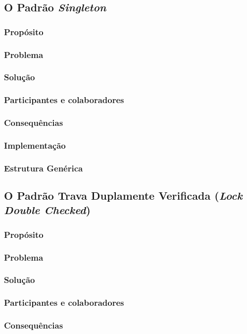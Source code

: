 \documentclass[
	11pt,				%
	openright,
	twoside,			%
	a4paper,			%
	english,			%
	french,
	brazil,				%
	sumario=tradicional
	]{abntex2}
\begin{document}
\subsection{O Padrão \textit{Singleton}}
\subsubsection{Propósito}
\subsubsection{Problema}
\subsubsection{Solução}
\subsubsection{Participantes e colaboradores}
\subsubsection{Consequências}
\subsubsection{Implementação}
\subsubsection{Estrutura Genérica}

\subsection{O Padrão Trava Duplamente Verificada (\textit{Lock Double Checked})}
\subsubsection{Propósito}
\subsubsection{Problema}
\subsubsection{Solução}
\subsubsection{Participantes e colaboradores}
\subsubsection{Consequências}
\end{document}
